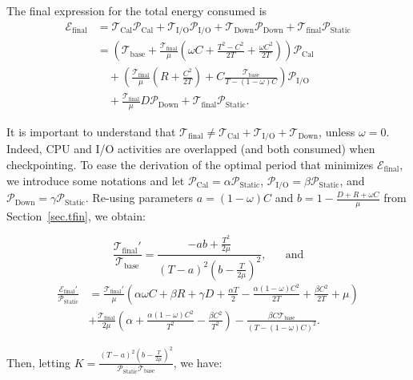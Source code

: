 \documentclass[a4paper]{article}
\newcommand{\ema}[1]{\ensuremath{#1}\xspace}
\newcommand{\ccc}{\ema{C}}
\newcommand{\rrr}{\ema{R}}
\newcommand{\ddd}{\ema{D}}
\newcommand{\period}{T}
\renewcommand{\time}[1][]{\ema{\mathcal{T}_{\text{#1}}}}
\newcommand{\tbase}{\time[base]}
\newcommand{\tfin}{\time[final]}
\newcommand{\tCal}{\time[Cal]}
\newcommand{\tIO}{\time[I/O]}
\newcommand{\tDown}{\time[Down]}
\newcommand{\power}[1][]{\ema{\mathcal{P}_{\text{#1}}}}
\newcommand{\pCal}{\power[Cal]}
\newcommand{\pIO}{\power[I/O]}
\newcommand{\pDown}{\power[Down]}
\newcommand{\pIdle}{\power[Static]}
\newcommand{\pStatic}{\power[Static]}
\newcommand{\E}[1][]{\ema{\mathcal{E}_{\text{#1}}}}
\newcommand{\efin}{\E[final]}
\newcommand{\workduringckpt}{\omega}
\newcommand{\cosi}{\alpha}
\newcommand{\ios}{\beta}
\newcommand{\dos}{\gamma}
\begin{document}
\medskip
The final expression for the total energy consumed is
\begin{align*}
\efin &= \tCal \pCal + \tIO \pIO + \tDown \pDown + \tfin \pIdle\\
 &= \left ( \tbase + \frac{\tfin}{\mu}\left ( \workduringckpt \ccc + \frac{\period^2 - \ccc^2}{2\period} + \frac{\workduringckpt \ccc^2}{2\period} \right ) \right ) \pCal \\
 & \quad+ \left ( \frac{\tfin}{\mu}\left ( \rrr + \frac{\ccc^2}{2\period}\right ) + \ccc \frac{\tbase}{\period - (1-\workduringckpt)\ccc}\right ) \pIO \\
 & \quad + \frac{\tfin}{\mu}\ddd \pDown + \tfin \pStatic .
\end{align*}

It is important to understand that $\tfin \neq \tCal + \tIO + \tDown$, unless $\workduringckpt=0$.
Indeed, CPU and I/O activities are overlapped (and both consumed) when checkpointing.
To ease the derivation  of the optimal period that minimizes \efin, we introduce some notations
and let  $\pCal =\cosi \pStatic$, $\pIO = \ios \pStatic$, 
and $\pDown = \dos \pStatic$.
Re-using parameters $a= (1-\workduringckpt)\ccc$ and $b=  1- \frac{\ddd + \rrr + \workduringckpt \ccc }{\mu}$
from Section~\ref{sec.tfin}, we obtain:

\[
\frac{\tfin'}{ \tbase} = \frac{-ab + \frac{T^2}{2\mu}}{\left ( \period - a \right )^2\left (b - \frac{\period}{2\mu} \right)^2} ,
\text{~~~~~and}\]
\begin{align*}
 \frac{\efin'}{\pStatic} &\!\!\!=\! \frac{\tfin'}{\mu}\! \left ( \cosi \workduringckpt \ccc \!+\! \ios \rrr\!+\! \dos \ddd \!+\! \frac{\cosi \period}{2} \!-\! \frac{\cosi(1-\workduringckpt) \ccc^2}{2\period}\!+\! \frac{\ios \ccc^2}{2\period} \!+\! \mu \right ) \\
&+ \frac{\tfin}{2\mu} \left ( \cosi \!+\! \frac{\cosi(1-\workduringckpt)\ccc^2}{\period^2} \!-\! \frac{\ios \ccc^2}{\period^2} \right ) \! -\! \frac{\ios \ccc \tbase}{\left ( \period \!-\! (1\!-\!\workduringckpt)\ccc \right )^2} .
\end{align*}

Then, letting $K = \frac{\left ( \period - a \right )^2\left (b - \frac{\period}{2\mu} \right)^2}{\pStatic\tbase}$, we have:
\end{document}

